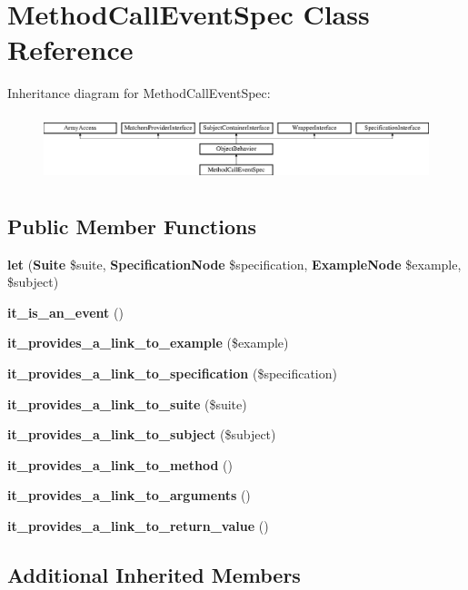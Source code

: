 \section{Method\+Call\+Event\+Spec Class Reference}
\label{classspec_1_1_php_spec_1_1_event_1_1_method_call_event_spec}
Inheritance diagram for Method\+Call\+Event\+Spec\+:\begin{figure}[H]
\begin{center}
\leavevmode
\includegraphics[height=1.953488cm]{classspec_1_1_php_spec_1_1_event_1_1_method_call_event_spec}
\end{center}
\end{figure}
\subsection*{Public Member Functions}
\begin{DoxyCompactItemize}
\item 
{\bf let} ({\bf Suite} \$suite, {\bf Specification\+Node} \$specification, {\bf Example\+Node} \$example, \$subject)
\item 
{\bf it\+\_\+is\+\_\+an\+\_\+event} ()
\item 
{\bf it\+\_\+provides\+\_\+a\+\_\+link\+\_\+to\+\_\+example} (\$example)
\item 
{\bf it\+\_\+provides\+\_\+a\+\_\+link\+\_\+to\+\_\+specification} (\$specification)
\item 
{\bf it\+\_\+provides\+\_\+a\+\_\+link\+\_\+to\+\_\+suite} (\$suite)
\item 
{\bf it\+\_\+provides\+\_\+a\+\_\+link\+\_\+to\+\_\+subject} (\$subject)
\item 
{\bf it\+\_\+provides\+\_\+a\+\_\+link\+\_\+to\+\_\+method} ()
\item 
{\bf it\+\_\+provides\+\_\+a\+\_\+link\+\_\+to\+\_\+arguments} ()
\item 
{\bf it\+\_\+provides\+\_\+a\+\_\+link\+\_\+to\+\_\+return\+\_\+value} ()
\end{DoxyCompactItemize}
\subsection*{Additional Inherited Members}


